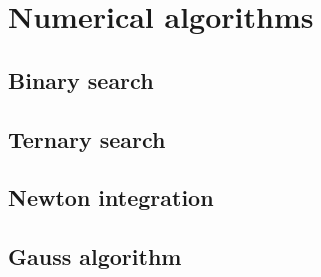 \documentclass[12pt,a4paper]{article}
\begin{document}


\section{Numerical algorithms}

\subsection{Binary search}



\subsection{Ternary search}



\subsection{Newton integration}



\subsection{Gauss algorithm}


\end{document}
